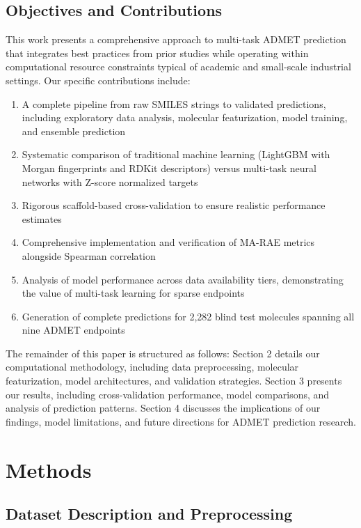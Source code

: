 \documentclass[11pt,a4paper]{article}
\begin{document}
\subsection{Objectives and Contributions}

This work presents a comprehensive approach to multi-task ADMET prediction that integrates best practices from prior studies while operating within computational resource constraints typical of academic and small-scale industrial settings. Our specific contributions include:

\begin{enumerate}
    \item A complete pipeline from raw SMILES strings to validated predictions, including exploratory data analysis, molecular featurization, model training, and ensemble prediction
    \item Systematic comparison of traditional machine learning (LightGBM with Morgan fingerprints and RDKit descriptors) versus multi-task neural networks with Z-score normalized targets
    \item Rigorous scaffold-based cross-validation to ensure realistic performance estimates
    \item Comprehensive implementation and verification of MA-RAE metrics alongside Spearman correlation
    \item Analysis of model performance across data availability tiers, demonstrating the value of multi-task learning for sparse endpoints
    \item Generation of complete predictions for 2,282 blind test molecules spanning all nine ADMET endpoints
\end{enumerate}

The remainder of this paper is structured as follows: Section 2 details our computational methodology, including data preprocessing, molecular featurization, model architectures, and validation strategies. Section 3 presents our results, including cross-validation performance, model comparisons, and analysis of prediction patterns. Section 4 discusses the implications of our findings, model limitations, and future directions for ADMET prediction research.

\section{Methods}

\subsection{Dataset Description and Preprocessing}
\end{document}
